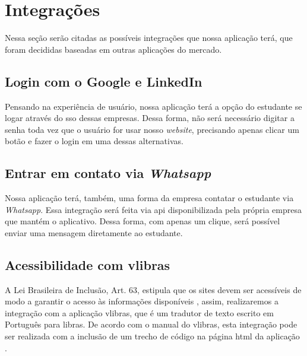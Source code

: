 \section{Integrações}
Nessa seção serão citadas as possíveis integrações que nossa aplicação terá, que foram decididas baseadas em outras aplicações do mercado.

\subsection{Login com o Google e LinkedIn}
Pensando na experiência de usuário, nossa aplicação terá a opção do estudante se logar através do \ac{sso} dessas empresas. Dessa forma, não será necessário digitar a senha toda vez que o usuário for usar nosso \emph{website}, precisando apenas clicar um botão e fazer o login em uma dessas alternativas.

\subsection{Entrar em contato via \emph{Whatsapp}}
Nossa aplicação terá, também, uma forma da empresa contatar o estudante via \emph{Whatsapp}. Essa integração será feita via \ac{api} disponibilizada pela própria empresa que mantém o aplicativo. Dessa forma, com apenas um clique, será possível enviar uma mensagem diretamente ao estudante.

\subsection{Acessibilidade com \gls{vlibras}}
A Lei Brasileira de Inclusão, Art. 63, estipula que os sites devem ser acessíveis de modo a garantir o acesso às informações disponíveis \cite{leiinclusao}, assim, realizaremos a integração com a aplicação \gls{vlibras}, que é um tradutor de texto escrito em Português para \ac{libras}. De acordo com o manual do \gls{vlibras}, esta integração pode ser realizada com a inclusão de um trecho de código na página \ac{html} da aplicação \cite{manualvlibras}.

\begin{comment}
\subsection{\ac{API} dos Correios}
Realizaremos uma integração do a \ac{API} dos Correios a fim de resgatar as informações de endereço dos usuários cadastrados a partir do CEP informado.
\end{comment}